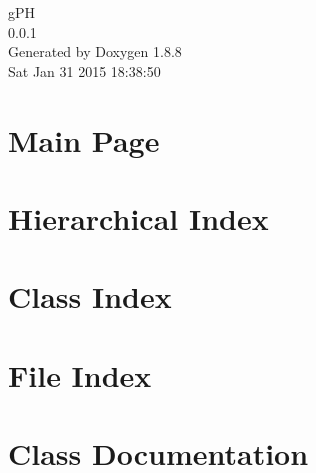 \documentclass[twoside]{book}
\newcommand{\+}{\discretionary{\mbox{\scriptsize$\hookleftarrow$}}{}{}}
\newcommand{\clearemptydoublepage}{%
  \newpage{\pagestyle{empty}\cleardoublepage}%
}
\begin{document}
\hypersetup{pageanchor=false,
             bookmarks=true,
             bookmarksnumbered=true,
             pdfencoding=unicode
            }
\begin{titlepage}
\vspace*{7cm}
\begin{center}%
{\Large g\+P\+H \\[1ex]\large 0.\+0.\+1 }\\
\vspace*{1cm}
{\large Generated by Doxygen 1.8.8}\\
\vspace*{0.5cm}
{\small Sat Jan 31 2015 18:38:50}\\
\end{center}
\end{titlepage}
\clearemptydoublepage
\tableofcontents
\clearemptydoublepage
{}
\hypersetup{pageanchor=true}

\chapter{Main Page}
\label{index}\hypertarget{index}{}
\chapter{Hierarchical Index}

\chapter{Class Index}

\chapter{File Index}

\chapter{Class Documentation}









































\end{document}
